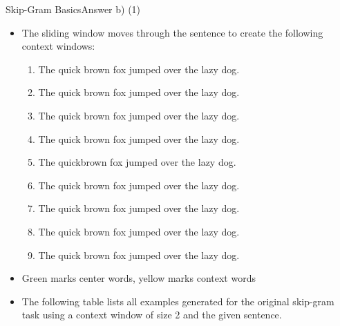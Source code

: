 \documentclass[t]{beamer}
\begin{document}
\begin{frame}{Skip-Gram Basics}{Answer b) (1)}
    \begin{itemize}
        \item The sliding window moves through the sentence to create the
              following context windows:
              \begin{enumerate}
                  \item \colorbox{green!30}{The} \colorbox{yellow!30}{quick}  \colorbox{yellow!30}{brown} fox jumped over the lazy dog.
                  \item \colorbox{yellow!30}{The} \colorbox{green!30}{quick} \colorbox{yellow!30}{brown} \colorbox{yellow!30}{fox} jumped over the lazy dog.
                  \item \colorbox{yellow!30}{The} \colorbox{yellow!30}{quick} \colorbox{green!30}{brown} \colorbox{yellow!30}{fox} \colorbox{yellow!30}{jumped} over the lazy dog.
                  \item The \colorbox{yellow!30}{quick} \colorbox{yellow!30}{brown} \colorbox{green!30}{fox} \colorbox{yellow!30}{jumped} \colorbox{yellow!30}{over} the lazy dog.
                  \item The quick\colorbox{yellow!30}{brown} \colorbox{yellow!30}{fox} \colorbox{green!30}{jumped} \colorbox{yellow!30}{over} \colorbox{yellow!30}{the} lazy dog.
                  \item The quick brown \colorbox{yellow!30}{fox} \colorbox{yellow!30}{jumped} \colorbox{green!30}{over} \colorbox{yellow!30}{the} \colorbox{yellow!30}{lazy} dog.
                  \item The quick brown fox \colorbox{yellow!30}{jumped} \colorbox{yellow!30}{over} \colorbox{green!30}{the} \colorbox{yellow!30}{lazy} \colorbox{yellow!30}{dog}.
                  \item The quick brown fox jumped \colorbox{yellow!30}{over} \colorbox{yellow!30}{the} \colorbox{green!30}{lazy} \colorbox{yellow!30}{dog}.
                  \item The quick brown fox jumped over \colorbox{yellow!30}{the} \colorbox{yellow!30}{lazy} \colorbox{green!30}{dog}.
              \end{enumerate}
        \item Green marks center words, yellow marks context words
        \item The following table lists all examples generated for the original
              skip-gram task using a context window of size 2 and the given
              sentence.
    \end{itemize}
\end{frame}
\end{document}
